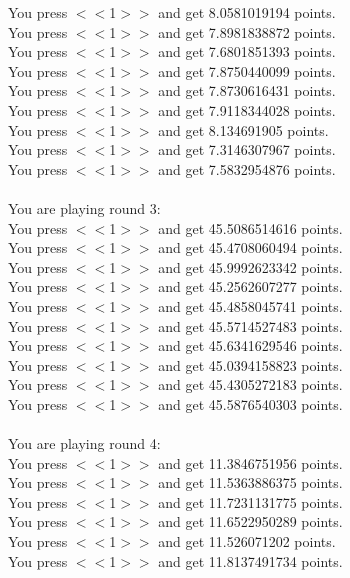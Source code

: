 \documentclass[pdflatex,sn-nature]{sn-jnl}%
\theoremstyle{thmstyleone}%
\theoremstyle{thmstyletwo}%
\theoremstyle{thmstylethree}%
\begin{document}
You press $<<$1$>>$ and get 8.0581019194 points. $~$\\ 
You press $<<$1$>>$ and get 7.8981838872 points. $~$\\ 
You press $<<$1$>>$ and get 7.6801851393 points. $~$\\ 
You press $<<$1$>>$ and get 7.8750440099 points. $~$\\ 
You press $<<$1$>>$ and get 7.8730616431 points. $~$\\ 
You press $<<$1$>>$ and get 7.9118344028 points. $~$\\ 
You press $<<$1$>>$ and get 8.134691905 points. $~$\\ 
You press $<<$1$>>$ and get 7.3146307967 points. $~$\\ 
You press $<<$1$>>$ and get 7.5832954876 points. $~$\\ 
 $~$\\ 
You are playing round 3: $~$\\ 
You press $<<$1$>>$ and get 45.5086514616 points. $~$\\ 
You press $<<$1$>>$ and get 45.4708060494 points. $~$\\ 
You press $<<$1$>>$ and get 45.9992623342 points. $~$\\ 
You press $<<$1$>>$ and get 45.2562607277 points. $~$\\ 
You press $<<$1$>>$ and get 45.4858045741 points. $~$\\ 
You press $<<$1$>>$ and get 45.5714527483 points. $~$\\ 
You press $<<$1$>>$ and get 45.6341629546 points. $~$\\ 
You press $<<$1$>>$ and get 45.0394158823 points. $~$\\ 
You press $<<$1$>>$ and get 45.4305272183 points. $~$\\ 
You press $<<$1$>>$ and get 45.5876540303 points. $~$\\ 
 $~$\\ 
You are playing round 4: $~$\\ 
You press $<<$1$>>$ and get 11.3846751956 points. $~$\\ 
You press $<<$1$>>$ and get 11.5363886375 points. $~$\\ 
You press $<<$1$>>$ and get 11.7231131775 points. $~$\\ 
You press $<<$1$>>$ and get 11.6522950289 points. $~$\\ 
You press $<<$1$>>$ and get 11.526071202 points. $~$\\ 
You press $<<$1$>>$ and get 11.8137491734 points. $~$\\ 
\end{document}

